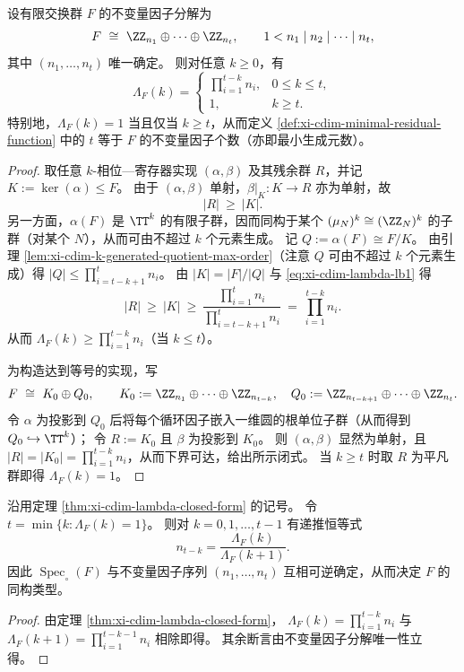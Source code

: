 \begin{theorem}\label{thm:xi-cdim-lambda-closed-form}
设有限交换群 \(F\) 的不变量因子分解为
\[
F\ \cong\ \ZZ_{n_1}\oplus\cdots\oplus\ZZ_{n_t},
\qquad
1<n_1\mid n_2\mid\cdots\mid n_t,
\]
其中 \((n_1,\dots,n_t)\) 唯一确定。
则对任意 \(k\ge 0\)，有
\[
\Lambda_F(k)=
\begin{cases}
\displaystyle \prod_{i=1}^{t-k} n_i,& 0\le k\le t,\\[6pt]
1,& k\ge t.
\end{cases}
\]
特别地，\(\Lambda_F(k)=1\) 当且仅当 \(k\ge t\)，从而定义 \ref{def:xi-cdim-minimal-residual-function} 中的 \(t\) 等于 \(F\) 的不变量因子个数（亦即最小生成元数）。
\end{theorem}
\begin{proof}
取任意 \(k\)-相位—寄存器实现 \((\alpha,\beta)\) 及其残余群 \(R\)，并记
\(
K:=\ker(\alpha)\le F
\)。
由于 \((\alpha,\beta)\) 单射，\(\beta|_{K}:K\to R\) 亦为单射，故
\begin{equation}\label{eq:xi-cdim-lambda-lb1}
|R|\ \ge\ |K|.
\end{equation}
另一方面，\(\alpha(F)\) 是 \(\TT^{k}\) 的有限子群，因而同构于某个 \((\mu_N)^k\cong(\ZZ_{N})^{k}\) 的子群（对某个 \(N\)），从而可由不超过 \(k\) 个元素生成。
记 \(Q:=\alpha(F)\cong F/K\)。
由引理 \ref{lem:xi-cdim-k-generated-quotient-max-order}（注意 \(Q\) 可由不超过 \(k\) 个元素生成）得
\(
|Q|\le \prod_{i=t-k+1}^{t}n_i
\)。
由 \(|K|=|F|/|Q|\) 与 \eqref{eq:xi-cdim-lambda-lb1} 得
\[
|R|\ \ge\ |K|
\ \ge\
\frac{\prod_{i=1}^{t}n_i}{\prod_{i=t-k+1}^{t}n_i}
\ =\
\prod_{i=1}^{t-k}n_i.
\]
从而 \(\Lambda_F(k)\ge \prod_{i=1}^{t-k}n_i\)（当 \(k\le t\)）。
\par
为构造达到等号的实现，写
\[
F\ \cong\ K_0\oplus Q_0,\qquad
K_0:=\ZZ_{n_1}\oplus\cdots\oplus\ZZ_{n_{t-k}},\quad
Q_0:=\ZZ_{n_{t-k+1}}\oplus\cdots\oplus\ZZ_{n_t}.
\]
令 \(\alpha\) 为投影到 \(Q_0\) 后将每个循环因子嵌入一维圆的根单位子群（从而得到 \(Q_0\hookrightarrow \TT^{k}\)）；
令 \(R:=K_0\) 且 \(\beta\) 为投影到 \(K_0\)。
则 \((\alpha,\beta)\) 显然为单射，且 \(|R|=|K_0|=\prod_{i=1}^{t-k}n_i\)，从而下界可达，给出所示闭式。
当 \(k\ge t\) 时取 \(R\) 为平凡群即得 \(\Lambda_F(k)=1\)。
\end{proof}

\begin{corollary}[圆维谱的完备性：由 \texorpdfstring{$\operatorname{Spec}_{\circ}(F)$}{Spec(F)} 恢复不变量因子]\label{cor:xi-cdim-spectrum-completeness}
沿用定理 \ref{thm:xi-cdim-lambda-closed-form} 的记号。
令 \(t=\min\{k:\Lambda_F(k)=1\}\)。
则对 \(k=0,1,\dots,t-1\) 有递推恒等式
\[
n_{t-k}=\frac{\Lambda_F(k)}{\Lambda_F(k+1)}.
\]
因此 \(\operatorname{Spec}_{\circ}(F)\) 与不变量因子序列 \((n_1,\dots,n_t)\) 互相可逆确定，从而决定 \(F\) 的同构类型。
\end{corollary}
\begin{proof}
由定理 \ref{thm:xi-cdim-lambda-closed-form}，
\(
\Lambda_F(k)=\prod_{i=1}^{t-k}n_i
\)
与
\(
\Lambda_F(k+1)=\prod_{i=1}^{t-k-1}n_i
\)
相除即得。
其余断言由不变量因子分解唯一性立得。
\end{proof}

